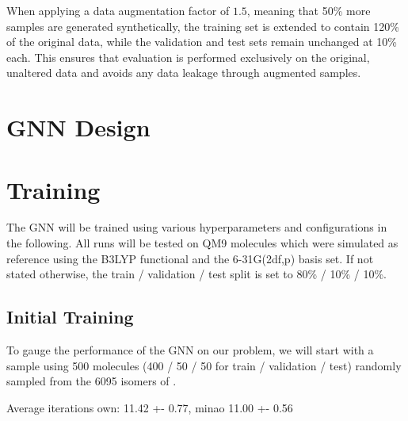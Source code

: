 When applying a data augmentation factor of $1.5$, meaning that 50\% more samples are generated synthetically, the training set is extended to contain 120\% of the original data, while the validation and test sets remain unchanged at 10\% each. This ensures that evaluation is performed exclusively on the original, unaltered data and avoids any data leakage through augmented samples.

\section{GNN Design}
\label{sec:gnn_design}

\TODO{}

\section{Training}
\label{sec:gnn_training}

The GNN will be trained using various hyperparameters and configurations in the following. All runs will be tested on QM9  molecules which were simulated as reference using the B3LYP functional and the 6-31G(2df,p) basis set. If not stated otherwise, the train / validation / test split is set to 80\% / 10\% / 10\%.\\
\TODO{}

\subsection{Initial Training}
\label{subsec:gnn_initial_training}
To gauge the performance of the GNN on our problem, we will start with a sample using 500 molecules (400 / 50 / 50 for train / validation / test) randomly sampled from the 6095 isomers of . 

Average iterations own: 11.42 +- 0.77, minao 11.00 +- 0.56

\TODO{}

        
